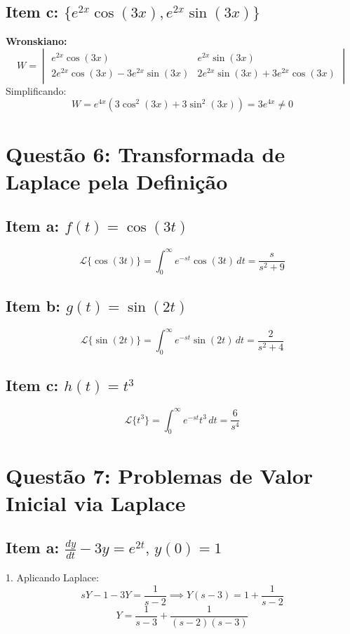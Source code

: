 \documentclass[12pt,a4paper]{article}
\begin{document}
\subsection*{Item c: \(\{e^{2x}\cos(3x), e^{2x}\sin(3x)\}\)}

\textbf{Wronskiano:}
\[
W = \begin{vmatrix}
e^{2x}\cos(3x) & e^{2x}\sin(3x) \\
2e^{2x}\cos(3x) - 3e^{2x}\sin(3x) & 2e^{2x}\sin(3x) + 3e^{2x}\cos(3x)
\end{vmatrix}
\]
Simplificando:
\[
W = e^{4x}(3\cos^2(3x) + 3\sin^2(3x)) = 3e^{4x} \neq 0
\]

\newpage
\section*{Questão 6: Transformada de Laplace pela Definição}

\subsection*{Item a: \(f(t) = \cos(3t)\)}
\[
\mathcal{L}\{\cos(3t)\} = \int_0^\infty e^{-st}\cos(3t)\, dt = \frac{s}{s^2 + 9}
\]

\subsection*{Item b: \(g(t) = \sin(2t)\)}
\[
\mathcal{L}\{\sin(2t)\} = \int_0^\infty e^{-st}\sin(2t)\, dt = \frac{2}{s^2 + 4}
\]

\subsection*{Item c: \(h(t) = t^3\)}
\[
\mathcal{L}\{t^3\} = \int_0^\infty e^{-st}t^3\, dt = \frac{6}{s^4}
\]

\newpage
\section*{Questão 7: Problemas de Valor Inicial via Laplace}

\subsection*{Item a: \(\frac{dy}{dt} - 3y = e^{2t}, \, y(0) = 1\)}

1. Aplicando Laplace:
\[
sY - 1 - 3Y = \frac{1}{s - 2} \implies Y(s - 3) = 1 + \frac{1}{s - 2}
\]
\[
Y = \frac{1}{s - 3} + \frac{1}{(s - 2)(s - 3)}
\]
\end{document}

